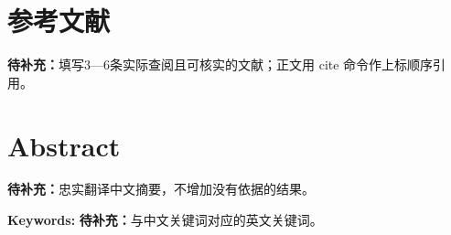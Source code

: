 \documentclass[UTF8,a4paper,11pt,fontset=fandol,scheme=plain]{ctexart}
\newcommand{\ReportTODO}[1]{\textbf{待补充：}#1}
\begin{document}
\section{参考文献}
\ReportTODO{填写3—6条实际查阅且可核实的文献；正文用 cite 命令作上标顺序引用。}

\par\bigskip\noindent\begin{minipage}{\linewidth}
\section*{Abstract}
\ReportTODO{忠实翻译中文摘要，不增加没有依据的结果。}
\par\noindent\textbf{Keywords: }\ReportTODO{与中文关键词对应的英文关键词。}
\end{minipage}\par

\end{document}
